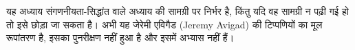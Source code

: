 \documentclass[../../../include/open-logic-chapter]{subfiles}
\begin{document}
\begin{editorial}
  यह अध्याय संगणनीयता-सिद्धांत वाले अध्याय की सामग्री पर निर्भर है, किंतु
  यदि वह सामग्री न पढ़ी गई हो तो इसे छोड़ा जा सकता है। अभी यह जेरेमी एविगैड
  (Jeremy Avigad) की टिप्पणियों का मूल रूपांतरण है, इसका पुनरीक्षण नहीं हुआ
  है और इसमें अभ्यास नहीं हैं।
\end{editorial}












\OLEndChapterHook
\end{document}
